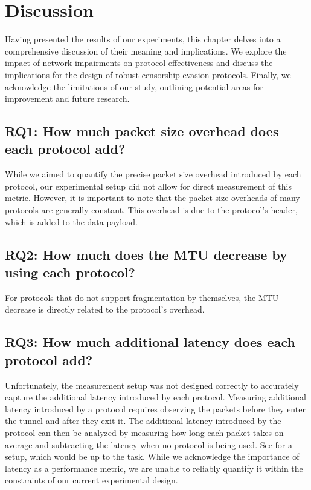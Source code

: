 
\chapter{Discussion}
\label{chap:discussion}
Having presented the results of our experiments, this chapter delves into a comprehensive discussion of their meaning and implications.
We explore the impact of network impairments on protocol effectiveness and discuss the implications for the design of robust censorship evasion protocols.
Finally, we acknowledge the limitations of our study, outlining potential areas for improvement and future research.




\section{RQ1: How much packet size overhead does each protocol add?}
While we aimed to quantify the precise packet size overhead introduced by each protocol, our experimental setup did not allow for direct measurement of this metric.
However, it is important to note that the packet size overheads of many protocols are generally constant.
This overhead is due to the protocol's header, which is added to the data payload.

\section{RQ2: How much does the MTU decrease by using each protocol?}
For protocols that do not support fragmentation by themselves, the MTU decrease is directly related to the protocol's overhead.

\section{RQ3: How much additional latency does each protocol add?}
Unfortunately, the measurement setup was not designed correctly to accurately capture the additional latency introduced by each protocol.
Measuring additional latency introduced by a protocol requires observing the packets before they enter the tunnel and after they exit it.
The additional latency introduced by the protocol can then be analyzed by measuring how long each packet takes on average and subtracting the latency when no protocol is being used.
See  for a setup, which would be up to the task.
While we acknowledge the importance of latency as a performance metric, we are unable to reliably quantify it within the constraints of our current experimental design.

